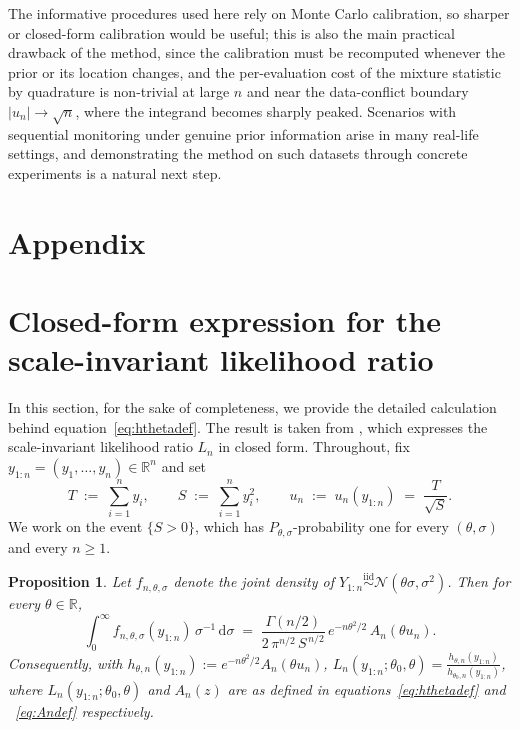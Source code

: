 \documentclass{article}%
\newtheorem{proposition}[theorem]{Proposition}
\newcommand{\diff}{\mathrm{d}}
\newcommand{\1}{\mathbf{1}}
\begin{document}
The informative procedures used here rely on Monte Carlo calibration, so sharper or closed-form calibration would be useful; this is also
the main practical drawback of the method, since the calibration must be
recomputed whenever the prior or its location changes, and the per-evaluation cost of the mixture statistic by quadrature is non-trivial at large $n$ and near the data-conflict boundary $|u_n| \to \sqrt{n}$, where the integrand becomes sharply peaked. Scenarios with sequential monitoring under genuine prior information arise in
many real-life settings, and demonstrating the method on such datasets through concrete experiments is a natural next step.






\appendix
\section*{Appendix}
\section{Closed-form expression for the scale-invariant likelihood ratio}\label{app:a}
In this section, for the sake of completeness, we provide the detailed calculation behind equation~\eqref{eq:hthetadef}. The result is taken from \cite{Wang2025}, which expresses the scale-invariant likelihood ratio $L_n$ in closed form. Throughout, fix $y_{1:n}=(y_1,\dots,y_n)\in\mathbb{R}^n$ and set
\[
  T \;:=\; \sum_{i=1}^{n}y_i,
  \qquad
  S \;:=\; \sum_{i=1}^{n}y_i^{2},
  \qquad
  u_n \;:=\; u_n(y_{1:n}) \;=\; \frac{T}{\sqrt{S}}.
\]
We work on the event $\{S>0\}$, which has $P_{\theta,\sigma}$-probability
one for every $(\theta,\sigma)$ and every $n\geq 1$.

\begin{proposition}
\label{prop:scale-invariant}
Let $f_{n,\theta,\sigma}$ denote the joint density of
$Y_{1:n}\stackrel{\mathrm{iid}}{\sim}\mathcal{N}(\theta\sigma,\sigma^{2})$.
Then for every $\theta\in\mathbb{R}$,
\begin{equation}
\label{eq:integratedlik}
\int_{0}^{\infty} f_{n,\theta,\sigma}(y_{1:n})\,\sigma^{-1}\,\diff\sigma
\;=\;
\frac{\Gamma(n/2)}{2\,\pi^{n/2}\,S^{\,n/2}}\,
e^{-n\theta^{2}/2}\, A_n(\theta u_n).
\end{equation}
Consequently, with $h_{\theta,n}(y_{1:n}):=e^{-n\theta^{2}/2}A_n(\theta u_n)$, $L_n(y_{1:n};\theta_0,\theta) = \frac{h_{\theta,n}(y_{1:n})}{h_{\theta_0,n}(y_{1:n})}$, 
where $L_n(y_{1:n};\theta_0,\theta)$ and $A_n(z)$ are as defined in equations~\eqref{eq:hthetadef} and ~\eqref{eq:Andef} respectively.

\end{proposition}
\end{document}
